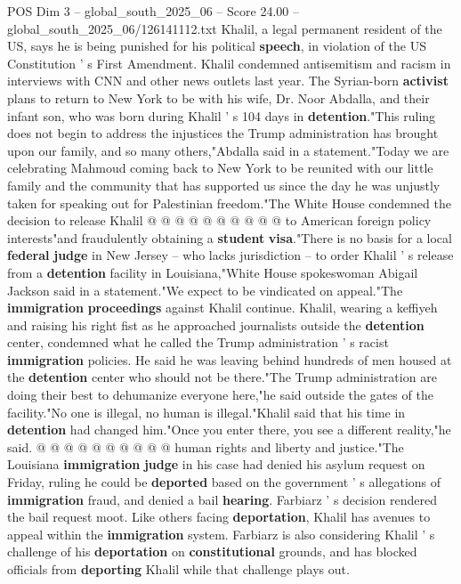 \begin{textsample}{POS Dim 3 – global\_south\_2025\_06 – Score 24.00 – global\_south\_2025\_06/126141112.txt}
Khalil, a legal permanent resident of the US, says he is being punished for his political \textbf{speech}, in violation of the US Constitution ' s First Amendment.
Khalil condemned antisemitism and racism in interviews with CNN and other news outlets last year.
The Syrian-born \textbf{activist} plans to return to New York to be with his wife, Dr.
Noor Abdalla, and their infant son, who was born during Khalil ' s 104 days in \textbf{detention}."This ruling does not begin to address the injustices the Trump administration has brought upon our family, and so many others,"Abdalla said in a statement."Today we are celebrating Mahmoud coming back to New York to be reunited with our little family and the community that has supported us since the day he was unjustly taken for speaking out for Palestinian freedom."The White House condemned the decision to release Khalil @ @ @ @ @ @ @ @ @ @ to American foreign policy interests"and fraudulently obtaining a \textbf{student} \textbf{visa}."There is no basis for a local \textbf{federal} \textbf{judge} in New Jersey -- who lacks jurisdiction -- to order Khalil ' s release from a \textbf{detention} facility in Louisiana,"White House spokeswoman Abigail Jackson said in a statement."We expect to be vindicated on appeal."The \textbf{immigration} \textbf{proceedings} against Khalil continue.
Khalil, wearing a keffiyeh and raising his right fist as he approached journalists outside the \textbf{detention} center, condemned what he called the Trump administration ' s racist \textbf{immigration} policies.
He said he was leaving behind hundreds of men housed at the \textbf{detention} center who should not be there."The Trump administration are doing their best to dehumanize everyone here,"he said outside the gates of the facility."No one is illegal, no human is illegal."Khalil said that his time in \textbf{detention} had changed him."Once you enter there, you see a different reality,"he said. @ @ @ @ @ @ @ @ @ @ human rights and liberty and justice."The Louisiana \textbf{immigration} \textbf{judge} in his case had denied his asylum request on Friday, ruling he could be \textbf{deported} based on the government ' s allegations of \textbf{immigration} fraud, and denied a bail \textbf{hearing}.
Farbiarz ' s decision rendered the bail request moot.
Like others facing \textbf{deportation}, Khalil has avenues to appeal within the \textbf{immigration} system.
Farbiarz is also considering Khalil ' s challenge of his \textbf{deportation} on \textbf{constitutional} grounds, and has blocked officials from \textbf{deporting} Khalil while that challenge plays out.

\end{textsample}
